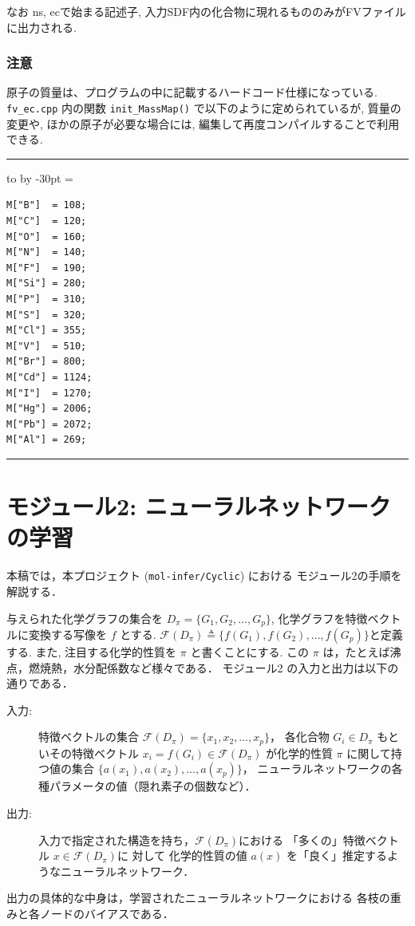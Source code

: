 \documentclass[11pt,titlepage,dvipdfmx,twoside]{jsbook}
\newenvironment{myframe}{\begin{trivlist}\item[]
    \hrule
    \hbox to \linewidth\bgroup
    \advance\linewidth by -30pt
    \hsize=\linewidth
    \vrule\hfill
    \vbox\bgroup
    \vskip15pt
    \def\thempfootnote{\arabic{mpfootnote}}
    \begin{minipage}{\linewidth}}{%
    \end{minipage}\vskip15pt
    \egroup\hfill\vrule
    \egroup\hrule
\end{trivlist}}
\newcommand{\project}{{\tt mol-infer/Cyclic}}
\begin{document}
なお ns, ecで始まる記述子,
入力SDF内の化合物に現れるもののみがFVファイルに出力される.

\subsection{注意}
\label{chap:caution}

原子の質量は、プログラムの中に記載するハードコード仕様になっている.
{\tt fv\_ec.cpp}
内の関数 {\tt init\_MassMap()}
で以下のように定められているが,
質量の変更や,
ほかの原子が必要な場合には,
編集して再度コンパイルすることで利用できる.

\begin{myframe}
\begin{verbatim}
M["B"]  = 108;
M["C"]  = 120;
M["O"]  = 160;
M["N"]  = 140;
M["F"]  = 190;
M["Si"] = 280;
M["P"]  = 310;
M["S"]  = 320;
M["Cl"] = 355;
M["V"]  = 510;
M["Br"] = 800;
M["Cd"] = 1124;
M["I"]  = 1270;
M["Hg"] = 2006;
M["Pb"] = 2072;
M["Al"] = 269;
\end{verbatim}
\end{myframe}

\chapter{モジュール2: ニューラルネットワークの学習}
本稿では，本プロジェクト (\project) における モジュール2の手順を解説する．

与えられた化学グラフの集合を $D_\pi=\{G_1,G_2,\dots,G_p\}$,
化学グラフを特徴ベクトルに変換する写像を $f$ とする.
${\mathcal F}(D_\pi)\triangleq\{f(G_1),f(G_2),\dots,f(G_p)\}$と定義する. 
また, 注目する化学的性質を $\pi$ と書くことにする.
この $\pi$ は，たとえば沸点，燃焼熱，水分配係数など様々である．
モジュール2 の入力と出力は以下の通りである．

\begin{oframed}
\begin{description}
\item[入力:] 特徴ベクトルの集合 ${\mathcal F}(D_\pi)=\{x_1,x_2,\dots,x_p\}$，
  各化合物 $G_i\in D_\pi$ もといその特徴ベクトル $x_i=f(G_i)\in{\mathcal F}(D_\pi)$
  が化学的性質 $\pi$ に関して持つ値の集合 $\{a(x_1),a(x_2),\dots,a(x_p)\}$，
  ニューラルネットワークの各種パラメータの値（隠れ素子の個数など）．
\item[出力:] 入力で指定された構造を持ち，${\mathcal F}(D_\pi)$における
  「多くの」特徴ベクトル $x\in {\mathcal F}(D_\pi)$に
  対して
  化学的性質の値 $a(x)$ を「良く」推定するようなニューラルネットワーク．
\end{description}
\end{oframed}
出力の具体的な中身は，学習されたニューラルネットワークにおける
各枝の重みと各ノードのバイアスである．
\end{document}

